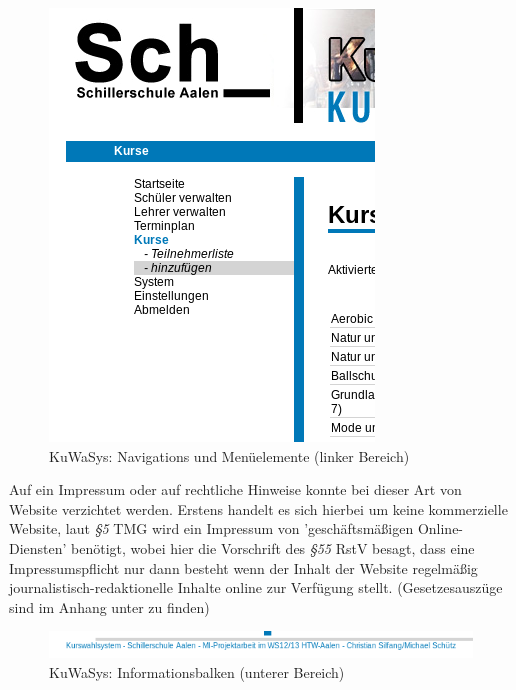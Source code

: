 \begin{figure}[H]
 \begin{center}
   \includegraphics[scale=0.65]{img/navigation_KuWaSys.png}
 \end{center}
 \caption[\textbf{KuWaSys: Navigations und Menüelemente (linker Bereich)}]{KuWaSys: Navigations und Menüelemente (linker Bereich)}
 \label{fig:navihervorhebung_KuWaSys}
\end{figure}

Auf ein Impressum oder auf rechtliche Hinweise konnte bei dieser Art von Website verzichtet werden. 
Erstens handelt es sich hierbei um keine kommerzielle Website, laut \textit{§5} \ac{TMG} wird ein Impressum von 'geschäftsmäßigen Online-Diensten' benötigt, wobei hier die Vorschrift des \textit{§55} \ac{RstV} besagt, dass eine Impressumspflicht nur dann besteht wenn der Inhalt der Website regelmäßig journalistisch-redaktionelle Inhalte online zur Verfügung stellt.
(Gesetzesauszüge sind im Anhang unter  zu finden) 

\begin{figure}[h]
 \begin{center}
   \includegraphics[scale=0.7]{img/footer_KuWaSys.png}
 \end{center}
 \caption[\textbf{KuWaSys: Informationsbalken (unterer Bereich)}]{KuWaSys: Informationsbalken (unterer Bereich)}
 \label{fig:footer_KuWaSys}
\end{figure}

